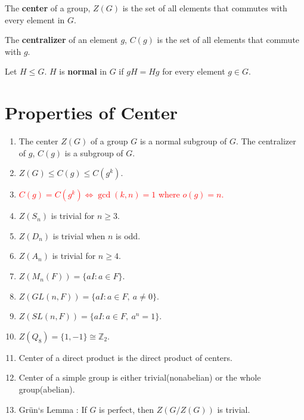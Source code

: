 \begin{definition}
	The \textbf{center} of a group, $Z(G)$ is the set of all elements that commutes with every element in $G$.
\end{definition}
\begin{definition}
	The \textbf{centralizer} of an element $g$, $C(g)$ is the set of all elements that commute with $g$.
\end{definition}
\begin{definition}
	Let $H \le G$. $H$ is \textbf{normal} in $G$ if $gH = Hg$ for every element $g \in G$.
\end{definition}
\section{Properties of Center}
\begin{enumerate}
	\item The center $Z(G)$ of a group $G$ is a normal subgroup of $G$. The centralizer of $g$, $C(g)$ is a subgroup of $G$.
	\item $Z(G) \le C(g) \le C(g^k)$.
	\item \textcolor{red}{$C(g) = C(g^k) \iff \gcd(k,n) = 1$ where $o(g)=n$.}
	\item $Z(S_n)$ is trivial for $n \ge 3$.
	\item $Z(D_n)$ is trivial when $n$ is odd.
	\item $Z(A_n)$ is trivial for $n \ge 4$.
	\item $Z(M_n(F)) = \{ aI : a \in F \}$.
	\item $Z(GL(n,F)) = \{ aI : a \in F,\ a \ne 0 \}$.
	\item $Z(SL(n,F)) = \{ aI : a \in F,\ a^n = 1 \}$.
	\item $Z(Q_8) = \{ 1,-1 \} \cong \mathbb{Z}_2$.
	\item Center of a direct product is the direct product of centers.
	\item Center of a simple group is either trivial(nonabelian) or the whole group(abelian).
	\item Gr\"un`s Lemma : If $G$ is perfect, then $Z(G/Z(G))$ is trivial.
\end{enumerate}

